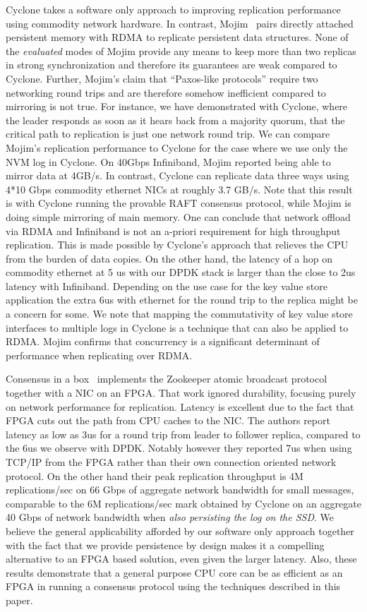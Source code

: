\documentclass[twocolumn]{article}
\begin{document}
Cyclone takes a software only approach to improving replication performance
using commodity network hardware. In contrast, Mojim~\cite{mojim} pairs directly
attached persistent memory with RDMA to replicate persistent data
structures. None of the \emph{evaluated} modes of Mojim provide any means to
keep more than two replicas in strong synchronization and therefore its
guarantees are weak compared to Cyclone.  Further, Mojim's claim that
``Paxos-like protocols'' require two networking round trips and are therefore
somehow inefficient compared to mirroring is not true. For instance, we have
demonstrated with Cyclone, where the leader responds as soon as it hears back
from a majority quorum, that the critical path to replication is just one
network round trip. We can compare Mojim's replication performance to Cyclone
for the case where we use only the NVM log in Cyclone. On 40Gbps Infiniband,
Mojim reported being able to mirror data at 4GB/s. In contrast, Cyclone can
replicate data three ways using 4*10 Gbps commodity ethernet NICs at roughly 3.7
GB/s. Note that this result is with Cyclone running the provable RAFT consensus
protocol, while Mojim is doing simple mirroring of main memory.  One can
conclude that network offload via RDMA and Infiniband is not an a-priori
requirement for high throughput replication. This is made possible by Cyclone's
approach that relieves the CPU from the burden of data copies. On the other
hand, the latency of a hop on commodity ethernet at 5 us with our DPDK stack is
larger than the close to 2us latency with Infiniband. Depending on the use case
for the key value store application the extra 6us with ethernet for the round
trip to the replica might be a concern for some. We note that mapping the
commutativity of key value store interfaces to multiple logs in Cyclone is a
technique that can also be applied to RDMA. Mojim confirms that concurrency is a
significant determinant of performance when replicating over RDMA.

Consensus in a box~\cite{consensus_box} implements the Zookeeper atomic
broadcast protocol together with a NIC on an FPGA. That work ignored durability,
focusing purely on network performance for replication. Latency is excellent due
to the fact that FPGA cuts out the path from CPU caches to the NIC. The authors
report latency as low as 3us for a round trip from leader to follower replica,
compared to the 6us we observe with DPDK. Notably however they reported 7us when
using TCP/IP from the FPGA rather than their own connection oriented network
protocol. On the other hand their peak replication throughput is 4M
replications/sec on 66 Gbps of aggregate network bandwidth for small messages,
comparable to the 6M replications/sec mark obtained by Cyclone on an aggregate
40 Gbps of network bandwidth when \emph{also persisting the log on the SSD}. We
believe the general applicability afforded by our software only approach
together with the fact that we provide persistence by design makes it a
compelling alternative to an FPGA based solution, even given the larger
latency. Also, these results demonstrate that a general purpose CPU core can be
as efficient as an FPGA in running a consensus protocol using the techniques
described in this paper.
\end{document}
